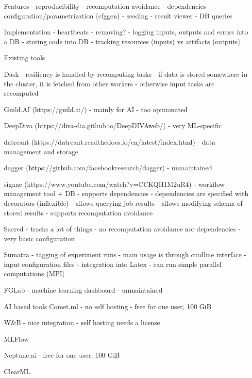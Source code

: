 Features
- reproducibility
- recomputation avoidance
- dependencies
- configuration/parametrization (cfggen)
- seeding
- result viewer
- DB queries

Implementation
- heartbeats
- removing?
- logging inputs, outputs and errors into a DB
- storing code into DB
- tracking resources (inputs) vs artifacts (outputs)

Existing tools

Dask
- resiliency is handled by recomputing tasks
- if data is stored somewhere in the cluster, it is fetched from other workers
- otherwise input tasks are recomputed

Guild.AI (https://guild.ai/)
- mainly for AI
- too opinionated

DeepDiva (https://diva-dia.github.io/DeepDIVAweb/)
- very ML-specific

datreant (https://datreant.readthedocs.io/en/latest/index.html)
- data management and storage

dagger (https://github.com/facebookresearch/dagger)
- unmaintained

signac (https://www.youtube.com/watch?v=CCKQH1M2uR4)
- workflow management tool + DB
- supports dependencies
    - dependencies are specified with decorators (inflexible)
- allows querying job results
- allows modifying schema of stored results
- supports recomputation avoidance

Sacred
- tracks a lot of things
- no recomputation avoidance nor dependencies
- very basic configuration

Sumatra
- tagging of experiment runs
- main usage is through cmdline interface
- input configuration files
- integration into Latex
- can run simple parallel computations (MPI)

FGLab
- machine learning dashboard
- unmaintained


AI based tools
Comet.ml
- no self hosting
- free for one user, 100 GiB

W&B
- nice integration
- self hosting needs a license

MLFlow

Neptune.ai
- free for one user, 100 GiB

ClearML
